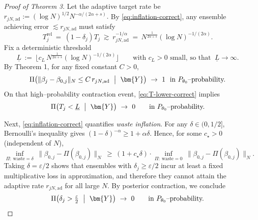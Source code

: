 \documentclass[11pt]{article}
\theoremstyle{plain}
\theoremstyle{definition}
\theoremstyle{plain}
\begin{document}
\begin{proof}[Proof of Theorem 3]
Let the adaptive target rate be
\(
r_{jN,\mathrm{ad}}:=(\log N)^{1/2}N^{-\alpha/(2\alpha+s)}.
\)
By \eqref{eq:inflation-correct}, any ensemble achieving error $\lesssim r_{jN,\mathrm{ad}}$
must satisfy
\begin{equation}\label{eq:T-lower-correct}
T_j^{\mathrm{rel}}\ =\ (1-\delta_j)T_j\ \gtrsim\ r_{jN,\mathrm{ad}}^{-1/\alpha}
\ =\ N^{\frac{1}{2\alpha+s}}(\log N)^{-1/(2\alpha)}.
\end{equation}
Fix a deterministic threshold
\[
\underline L\ :=\ \Big\lfloor c_L\,N^{\frac{1}{2\alpha+s}}(\log N)^{-1/(2\alpha)}\Big\rfloor
\qquad\text{with }c_L>0\text{ small, so that }\ \underline L\to\infty.
\]
By Theorem 1, for any fixed constant $C>0$,
\[
\Pi\big(\|\beta_j-\beta_{0,j}\|_N\le C\,r_{jN,\mathrm{ad}}\ \bigm|\ \bm{Y}\big)\ \to\ 1
\ \ \text{in $P_{\theta_0}$–probability.}
\]
On that high–probability contraction event, \eqref{eq:T-lower-correct} implies
\begin{equation}\label{eq:T-large-correct}
\Pi\big(T_j<\underline L\ \bigm| \ \bm{Y}\big)\ \to\ 0
\qquad\text{in $P_{\theta_0}$–probability.}
\end{equation}

Next, \eqref{eq:inflation-correct} quantifies \emph{waste inflation}.
For any $\delta\in(0,1/2]$, Bernoulli’s inequality gives
\(
(1-\delta)^{-\alpha}\ge 1+\alpha\delta.
\)
Hence, for some $c_\star>0$ (independent of $N$),
\[
\inf_{\Pi:\ \text{waste}=\delta}\ \|\beta_{0,j}-\Pi(\beta_{0,j})\|_N
\ \ge\ (1+c_\star \delta)\cdot \inf_{\Pi:\ \text{waste}=0}\ \|\beta_{0,j}-\Pi(\beta_{0,j})\|_N.
\]
Taking $\delta=\varepsilon/2$ shows that ensembles with $\delta_j\ge \varepsilon/2$ incur at least a fixed
multiplicative loss in approximation, and therefore they cannot attain the adaptive rate $r_{jN,\mathrm{ad}}$
for all large $N$. By posterior contraction, we conclude
\begin{equation}\label{eq:waste-small-correct}
\Pi\big(\delta_j>\tfrac{\varepsilon}{2}\ \bigm|\ \bm{Y}\big)\ \to\ 0
\qquad\text{in $P_{\theta_0}$–probability.}
\end{equation}


\end{proof}
\end{document}
